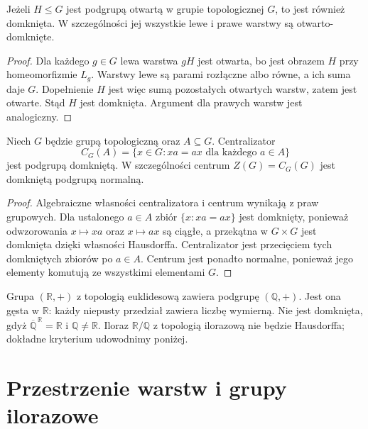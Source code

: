 \begin{stwierdzenie}
\label{prop:topog24-open-closed}
Jeżeli \(H\le G\) jest podgrupą
otwartą w grupie topologicznej \(G\),
to jest również domknięta.
W szczególności jej wszystkie lewe
i prawe warstwy są otwarto-domknięte.
\end{stwierdzenie}
\begin{proof}
Dla każdego \(g\in G\) lewa
warstwa \(gH\) jest otwarta,
bo jest obrazem \(H\)
przy homeomorfizmie \(L_g\).
Warstwy lewe są parami rozłączne
albo równe, a ich suma daje \(G\).
Dopełnienie \(H\) jest więc sumą
pozostałych otwartych warstw,
zatem jest otwarte.
Stąd \(H\) jest domknięta.
Argument dla prawych warstw
jest analogiczny.
\end{proof}

\begin{stwierdzenie}
\label{prop:topog24-centralizers}
Niech \(G\) będzie grupą topologiczną
oraz \(A\subseteq G\).
Centralizator
\[
 C_G(A)=\{x\in G:xa=ax
              \text{ dla każdego }a\in A\}
\]
jest podgrupą domkniętą.
W szczególności centrum
\(Z(G)=C_G(G)\)
jest domkniętą podgrupą normalną.
\end{stwierdzenie}
\begin{proof}
Algebraiczne własności centralizatora
i centrum wynikają z praw grupowych.
Dla ustalonego \(a\in A\)
zbiór \(\{x:xa=ax\}\)
jest domknięty, ponieważ
odwzorowania \(x\mapsto xa\)
oraz \(x\mapsto ax\)
są ciągłe, a przekątna w
\(G\times G\) jest domknięta
dzięki własności Hausdorffa.
Centralizator jest przecięciem
tych domkniętych zbiorów po \(a\in A\).
Centrum jest ponadto normalne,
ponieważ jego elementy komutują
ze wszystkimi elementami \(G\).
\end{proof}

\begin{przyklad}
\label{ex:topog24-rational-subgroup}
Grupa \((\mathbb R,+)\) z topologią euklidesową
zawiera podgrupę \((\mathbb Q,+)\).
Jest ona gęsta w \(\mathbb R\):
każdy niepusty przedział
zawiera liczbę wymierną.
Nie jest domknięta, gdyż
\(\overline{\mathbb Q}^{\,\mathbb R}=\mathbb R\)
i \(\mathbb Q\neq\mathbb R\).
Iloraz \(\mathbb R/\mathbb Q\)
z topologią ilorazową
nie będzie Hausdorffa;
dokładne kryterium udowodnimy poniżej.
\end{przyklad}

\section{Przestrzenie warstw i grupy ilorazowe}
\label{sec:topog24-quotients}

